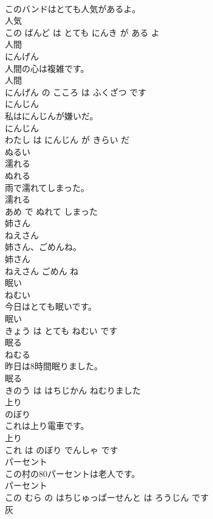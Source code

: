 \documentclass[8pt]{extreport}
\begin{document}
\begin{CJK}{UTF8}{min}
\\	このバンドはとても人気があるよ。	
\\	人気 
\\	この ばんど は とても にんき が ある よ			
\\	人間	
\\	にんげん			
\\	人間の心は複雑です。	
\\	人間 
\\	にんげん の こころ は ふくざつ です			
\\	にんじん	
\\	私はにんじんが嫌いだ。	
\\	にんじん 
\\	わたし は にんじん が きらい だ			
\\	ぬるい	
\\	濡れる	
\\	ぬれる			
\\	雨で濡れてしまった。	
\\	濡れる 
\\	あめ で ぬれて しまった			
\\	姉さん	
\\	ねえさん			
\\	姉さん、ごめんね。	
\\	姉さん 
\\	ねえさん ごめん ね			
\\	眠い	
\\	ねむい			
\\	今日はとても眠いです。	
\\	眠い 
\\	きょう は とても ねむい です			
\\	眠る	
\\	ねむる			
\\	昨日は8時間眠りました。	
\\	眠る 
\\	きのう は はちじかん ねむりました			
\\	上り	
\\	のぼり			
\\	これは上り電車です。	
\\	上り 
\\	これ は のぼり でんしゃ です			
\\	パーセント	
\\	この村の80パーセントは老人です。	
\\	パーセント 
\\	この むら の はちじゅっぱーせんと は ろうじん です			
\\	灰	

\end{CJK}
\end{document}
